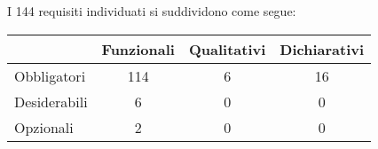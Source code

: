 I 144 requisiti individuati si suddividono come segue:
\begin{center}
  \centering
  \begin{tabular}{|l|c|c|c|}
    \hline
      & Funzionali & Qualitativi & Dichiarativi   \\
\hline
Obbligatori &      114     &    6     & 16       \\
\hline
Desiderabili &     6     &     0     & 0    \\
\hline
Opzionali   &      2     &    0     & 0    \\
\hline
  \end{tabular}
\end{center}

